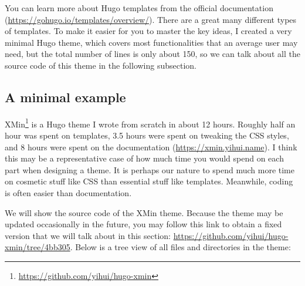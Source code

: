 \documentclass[12pt,]{krantz}
\renewcommand{\href}[2]{#2\footnote{\url{#1}}}
\theoremstyle{definition}
\theoremstyle{definition}
\theoremstyle{definition}
\theoremstyle{remark}
\begin{document}
You can learn more about Hugo templates from the official documentation
(\url{https://gohugo.io/templates/overview/}). There are a great many
different types of templates. To make it easier for you to master the
key ideas, I created a very minimal Hugo theme, which covers most
functionalities that an average user may need, but the total number of
lines is only about 150, so we can talk about all the source code of
this theme in the following subsection.

\subsection{A minimal example}\label{a-minimal-example}

\href{https://github.com/yihui/hugo-xmin}{XMin} is a Hugo
theme I wrote from scratch in about 12 hours. Roughly
half an hour was spent on templates, 3.5 hours were spent on tweaking
the CSS styles, and 8 hours were spent on the documentation
(\url{https://xmin.yihui.name}). I think this may be a representative
case of how much time you would spend on each part when designing a
theme. It is perhaps our nature to spend much more time on cosmetic
stuff like CSS than essential stuff like templates. Meanwhile, coding is
often easier than documentation.

We will show the source code of the XMin theme. Because the theme may be
updated occasionally in the future, you may follow this link to obtain a
fixed version that we will talk about in this section:
\url{https://github.com/yihui/hugo-xmin/tree/4bb305}. Below is a tree
view of all files and directories in the theme:
\end{document}
